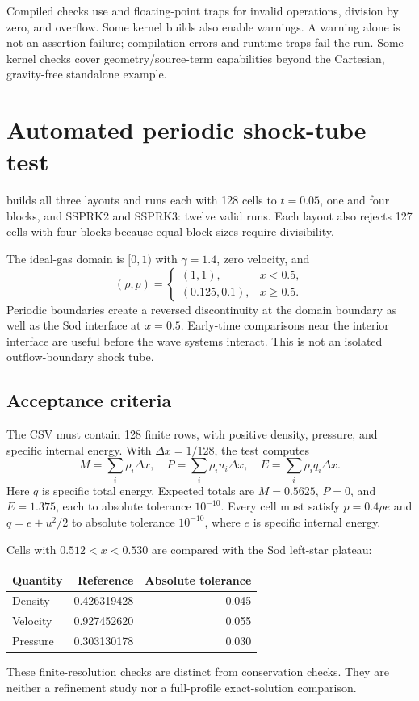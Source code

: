 \documentclass[11pt]{article}
\newcommand{\file}[1]{\texttt{\detokenize{#1}}}
\begin{document}
Compiled checks use \file{-fcheck=all} and floating-point traps for invalid operations, division by zero, and overflow. Some kernel builds also enable warnings. A warning alone is not an assertion failure; compilation errors and runtime traps fail the run. Some kernel checks cover geometry/source-term capabilities beyond the Cartesian, gravity-free standalone example.

\section{Automated periodic shock-tube test}
\file{test_standalone.py} builds all three layouts and runs each with 128 cells to $t=0.05$, one and four blocks, and SSPRK2 and SSPRK3: twelve valid runs. Each layout also rejects 127 cells with four blocks because equal block sizes require divisibility.

The ideal-gas domain is $[0,1)$ with $\gamma=1.4$, zero velocity, and
\[
(\rho,p)=\begin{cases}(1,1),&x<0.5,\\(0.125,0.1),&x\geq0.5.\end{cases}
\]
Periodic boundaries create a reversed discontinuity at the domain boundary as well as the Sod interface at $x=0.5$. Early-time comparisons near the interior interface are useful before the wave systems interact. This is not an isolated outflow-boundary shock tube.

\subsection{Acceptance criteria}
The CSV must contain 128 finite rows, with positive density, pressure, and specific internal energy. With $\Delta x=1/128$, the test computes
\[
M=\sum_i\rho_i\Delta x,\quad P=\sum_i\rho_i u_i\Delta x,\quad E=\sum_i\rho_i q_i\Delta x.
\]
Here $q$ is specific total energy. Expected totals are $M=0.5625$, $P=0$, and $E=1.375$, each to absolute tolerance $10^{-10}$. Every cell must satisfy $p=0.4\rho e$ and $q=e+u^2/2$ to absolute tolerance $10^{-10}$, where $e$ is specific internal energy.

Cells with $0.512<x<0.530$ are compared with the Sod left-star plateau:
\begin{center}
\begin{tabular}{lrr}\toprule
Quantity & Reference & Absolute tolerance \\
\midrule
Density & 0.426319428 & 0.045 \\
Velocity & 0.927452620 & 0.055 \\
Pressure & 0.303130178 & 0.030 \\
\bottomrule\end{tabular}
\end{center}
These finite-resolution checks are distinct from conservation checks. They are neither a refinement study nor a full-profile exact-solution comparison.
\end{document}
